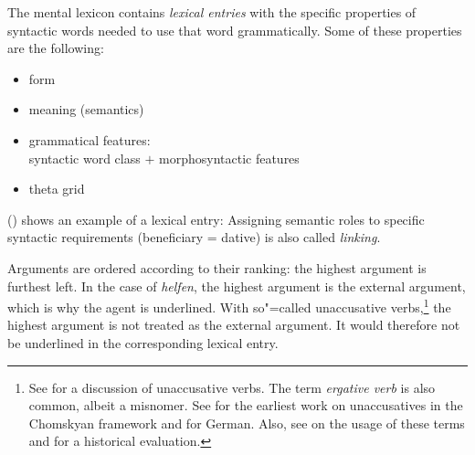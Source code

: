 The mental lexicon contains \emph{lexical entries} with the specific properties of syntactic words needed to use that word grammatically.
Some of these properties are the following:
\begin{itemize}
\item form
\item meaning (semantics)
\item grammatical features:\\
      syntactic word class $+$ morphosyntactic features   
\item theta grid
\end{itemize}

\noindent
() shows an example of a lexical entry:
\ea
{}
\z
Assigning semantic roles to specific syntactic requirements (beneficiary = dative) is also called \emph{linking}.

Arguments are ordered according to their ranking: the highest argument is furthest left. In the case
of \emph{helfen}, the highest argument is the external argument, which is why the agent is underlined. With so"=called unaccusative verbs,\footnote{
See  for a discussion of unaccusative verbs. The term \emph{ergative verb} is also common, albeit
a misnomer. See  for the earliest work on unaccusatives in the Chomskyan framework and 
 for German. Also, see  on the usage of these terms and for a historical evaluation.
}
the highest argument is not treated as the external argument. It would therefore not be underlined in the corresponding lexical entry.

